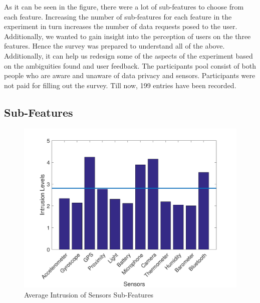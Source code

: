 As it can be seen in the figure, there were a lot of sub-features to choose from each feature.
Increasing the number of sub-features for each feature in the experiment in turn increases the number of data requests posed to the user. Additionally,
we wanted to gain insight into the perception of users on the three features. Hence the survey
was prepared to understand all of the above. Additionally, it can help us redesign some of the aspects of the experiment based on the
ambiguities found and user feedback. The participants pool consist of both people who are aware and unaware of data privacy and sensors. Participants were not paid for filling out the survey. Till now, 199 entries have been recorded.

\subsection{Sub-Features}

\begin{figure}[ht!]
\centering
\includegraphics[width=\textwidth,keepaspectratio]{./images/pre_se}
\caption{Average Intrusion of Sensors Sub-Features}
\label{fig:pre_se}
\end{figure}

